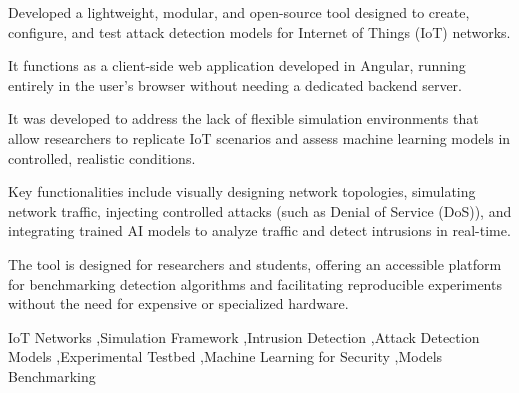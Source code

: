 \documentclass[preprint,12pt, a4paper]{elsarticle}
\begin{document}
\begin{frontmatter}
\begin{highlights}
    \item Developed a lightweight, modular, and open-source tool designed to create, configure, and test attack detection models for Internet of Things (IoT) networks.
    \item It functions as a client-side web application developed in Angular, running entirely in the user's browser without needing a dedicated backend server.
    \item It was developed to address the lack of flexible simulation environments that allow researchers to replicate IoT scenarios and assess machine learning models in controlled, realistic conditions.
    \item Key functionalities include visually designing network topologies, simulating network traffic, injecting controlled attacks (such as Denial of Service (DoS)), and integrating trained AI models to analyze traffic and detect intrusions in real-time.
    \item The tool is designed for researchers and students, offering an accessible platform for benchmarking detection algorithms and facilitating reproducible experiments without the need for expensive or specialized hardware.
\end{highlights}

\begin{keyword}
IoT Networks \sep Simulation Framework \sep Intrusion Detection \sep Attack Detection Models \sep Experimental Testbed \sep Machine Learning for Security \sep Models Benchmarking
\end{keyword}
\end{frontmatter}



\end{document}
